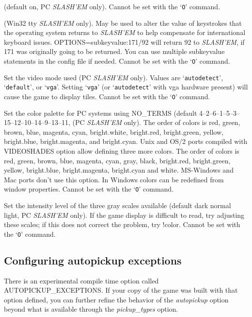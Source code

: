 \item[\ib{soundcard}]
(default on, PC {\it SLASH'EM\/} only).
Cannot be set with the `{\tt O}' command.

\item[\ib{subkeyvalue}]
(Win32 tty {\it SLASH'EM\/} only).
May be used to alter the value of keystrokes that the operating system
returns to {\it SLASH'EM\/} to help compensate for international keyboard issues.
OPTIONS=subkeyvalue:171/92
will return 92 to {\it SLASH'EM}, if 171 was originally going to be returned.
You can use multiple subkeyvalue statements in the config file if needed.
Cannot be set with the `{\tt O}' command.

\item[\ib{video}]
Set the video mode used (PC {\it SLASH'EM\/} only).
Values are `{\tt autodetect}', `{\tt default}', or `{\tt vga}'.
Setting `{\tt vga}' (or `{\tt autodetect}' with vga hardware present) will cause
the game to display tiles. 
Cannot be set with the `{\tt O}' command.

\item[\ib{videocolors}]
Set the color palette for PC systems using NO\_TERMS
(default 4--2--6--1--5--3--15--12--10--14--9--13--11, (PC {\it SLASH'EM\/} only).
The order of colors is red, green, brown, blue, magenta, cyan,
bright.white, bright.red, bright.green, yellow, bright.blue,
bright.magenta, and bright.cyan.
Unix and OS/2 ports compiled with VIDEOSHADES option allow defining 
three more colors. The order of colors is red, green, brown, blue, 
magenta, cyan, gray, black, bright.red, bright.green, yellow, 
bright.blue, bright.magenta, bright.cyan and white.
MS-Windows and Mac ports don't use this option. In Windows colors can be 
redefined from window properties.
Cannot be set with the `{\tt O}' command.

\item[\ib{videoshades}]
Set the intensity level of the three gray scales available
(default dark normal light, PC {\it SLASH'EM\/} only).
If the game display is difficult to read, try adjusting these scales;
if this does not correct the problem, try !color.
Cannot be set with the `{\tt O}' command.
\elist
\nd %
\subsection*{Configuring autopickup exceptions}


There is an experimental compile time option called AUTOPICKUP\_EXCEPTIONS.  
If your copy of the game was built with that option defined, you can 
further refine the behavior of the
{\it autopickup\/} 
option beyond what is available through the 
{\it pickup_types\/} 
option. 

